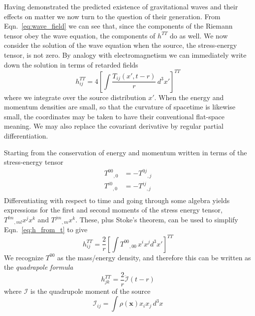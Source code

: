 Having demonstrated the predicted existence of gravitational waves and
their effects on matter we now turn to the question of their
generation.  From Eqn.~\ref{eq:wave_field} we can see that, since
the components of the Riemann tensor obey the wave equation, the
components of $h^{TT}$ do as well.  We now consider the solution of
the wave equation when the source, the stress-energy tensor, is not
zero.  By analogy with electromagnetism we can immediately write down
the solution in terms of retarded fields
%
\begin{equation}
\label{eq:h_from_t}
h^{TT}_{ij} = 4 \left[ \int \frac{T_{ij}(x', t-r)}{r}\, d^3 x'
\right]^{TT}
\end{equation}
%
where we integrate over the source distribution $x'$.  When the energy
and momentum densities are small, so that the curvature of spacetime
is likewise small, the coordinates may be taken to have their
conventional flat-space meaning.  We may also replace the covariant
derivative by regular partial differentiation.

Starting from the conservation of energy and momentum written in terms
of the stress-energy tensor
%
\begin{align*}
{T^{00}}_{,0} &= - {T^{0j}}_{,j} \\
{T^{i0}}_{,0} &= - {T^{ij}}_{,j} \\
\end{align*}
%
Differentiating with respect to time and going through some algebra
yields expressions for the first and second moments of the stress
energy tensor, ${T^{lm}}_{,ml} x^j x^k$ and ${T^{jm}}_{,m} x^k$.  These,
plus Stoke's theorem, can be used to simplify
Eqn.~\ref{eq:h_from_t} to give
%
\begin{equation*}
h^{TT}_{ij} = \frac{2}{r} \left[
\int {T^{00}}_{,00}\, x^i x^j d^3 x' \right]^{TT}
\end{equation*}
%
We recognize $T^{00}$ as the mass/energy density, and therefore this
can be written as the \emph{quadrapole formula}
%
\begin{equation}
\label{eq:quadrupole_formula}
h^{TT}_{jk} = \frac{2}{r} \ddot{\mathcal{I}}(t-r)
\end{equation}
%
where $\mathcal{I}$ is the quadrupole moment of the source
%
\begin{equation*}
\mathcal{I}_{ij} = \int \rho(\mathbf{x})x_i x_j\,d^3 x
\end{equation*}

